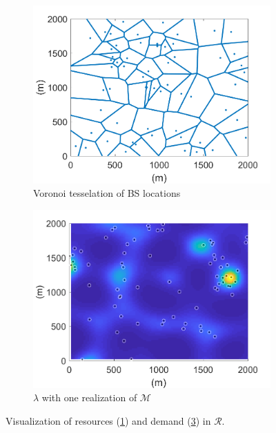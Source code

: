 \documentclass[conference]{IEEEtran}
\begin{document}
\begin{figure}[t]
	\centering
	\begin{minipage}{0.64\textwidth}
		\begin{subfigure}{.48\textwidth}
			\centering
			\includegraphics[width=0.95\linewidth]{Figures/BSLocationsVoronoi}
			\caption{Voronoi tesselation of BS locations}
			\label{fig:BSLocVor}
		\end{subfigure} \hfill
		\begin{subfigure}{.48\textwidth}
			\centering
			\includegraphics[width=0.95\linewidth]{Figures/SSLTnsPPP_demandpointreal}
			\caption{$\lambda$ with one realization of $\mathcal{M}$}
			\label{fig:SSLTDPReal}
		\end{subfigure}
		\caption{\small Visualization of resources (\cref{fig:BSLocVor}) and demand (\cref{fig:SSLTDPReal}) in $\mathcal{R}$.}

\end{minipage}
\end{figure}
\end{document}
